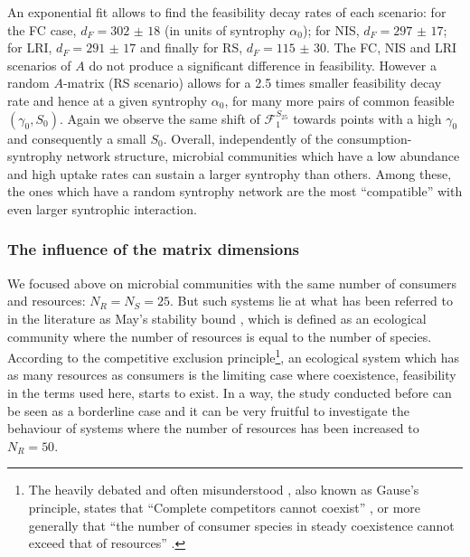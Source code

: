 \documentclass[12pt, titlepage]{report}
\begin{document}
An exponential fit allows to find the feasibility decay rates of each scenario: for the FC case, $d_F=\num[scientific-notation=false]{302(18)}$ (in units of syntrophy $\alpha_0$); for NIS, $d_F=\num[scientific-notation=false]{297(17)}$; for LRI, $d_F=\num[scientific-notation=false]{291(17)}$ and finally for RS, $d_F=\num[scientific-notation=false]{115(30)}$. The FC, NIS and LRI scenarios of $A$ do not produce a significant difference in feasibility. However a random $A$-matrix (RS scenario) allows for a 2.5 times smaller feasibility decay rate and hence at a given syntrophy $\alpha_0$, for many more pairs of common feasible $(\gamma_0, S_0)$.
Again we observe the same shift of $\mathcal{F}_1^{S_{25}}$ towards points with a high $\gamma_0$ and consequently a small $S_0$. Overall, independently of the consumption-syntrophy network structure, microbial communities which have a low abundance and high uptake rates can sustain a larger syntrophy than others. Among these, the ones which have a random syntrophy network are the most ``compatible'' with even larger syntrophic interaction.



\subsubsection{The influence of the matrix dimensions}
We focused above on microbial communities with the same number of consumers and resources: $N_R=N_S=25$. But such systems lie at what has been referred to in the literature as May's stability bound \cite{biroli_marginally_2018}, which is defined as an ecological community where the number of resources is equal to the number of species. According to the competitive exclusion principle\footnote{The heavily debated and often misunderstood \cite{hardin_competitive_1960} , also known as Gause's principle, states that ``Complete competitors cannot coexist'' \cite{hardin_competitive_1960}, or more generally that ``the number of consumer species in steady coexistence cannot exceed that of resources'' \cite{wang_overcome_2019}.}, an ecological system which has as many resources as consumers is the limiting case where coexistence, \ie feasibility in the terms used here, starts to exist. In a way, the study conducted before can be seen as a borderline case and it can be very fruitful to investigate the behaviour of systems where the number of resources has been increased to $N_R=50$.
\end{document}

